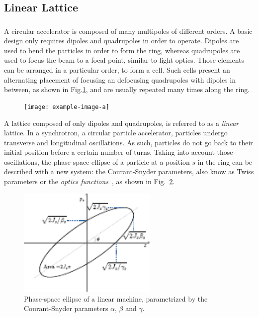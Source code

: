 \subsection{Linear Lattice}


\subsubsection{}
\label{section:courant_snyder}

A circular accelerator is composed of many multipoles of different orders. A basic
design only requires dipoles and quadrupoles in order to operate. Dipoles are used to bend the
particles in order to form the ring, whereas quadrupoles are used to focus the beam to a focal
point, similar to light optics.
Those elements can be arranged in a particular order, to form a  cell. Such cells present
an alternating placement of focusing an defocusing quadrupoles with dipoles in between, as shown in
Fig.\ref{fig:coordinate_systems:fodo}, and are usually repeated many times along the ring.

\begin{figure}[H]
    \centering
    \texttt{[image: example-image-a]}
    \caption{}
    \label{fig:coordinate_systems:fodo}
\end{figure}

A lattice composed of only dipoles and quadrupoles, is referred to as a \textit{linear} lattice.
In a synchrotron, a circular particle accelerator, particles undergo transverse and longitudinal 
oscillations. As such, particles do not go back to their initial position before a certain number
of turns. Taking into account those oscillations, the phase-space ellipse of a particle at a 
position $s$ in the ring can be described with a new system: the Courant-Snyder parameters, also
know as Twiss parameters or the \textit{optics functions}~\cite{courant_theory_1958}, as shown in
Fig.~\ref{fig:coordinate_systems:twiss}.\\

\begin{figure}[H]
    \centering
    \includegraphics[width=0.6\textwidth]{images/phase_space.pdf}
    \caption{Phase-space ellipse of a linear machine, parametrized by the Courant-Snyder
    parameters $\alpha$, $\beta$ and $\gamma$.}
    \label{fig:coordinate_systems:twiss}
\end{figure}

